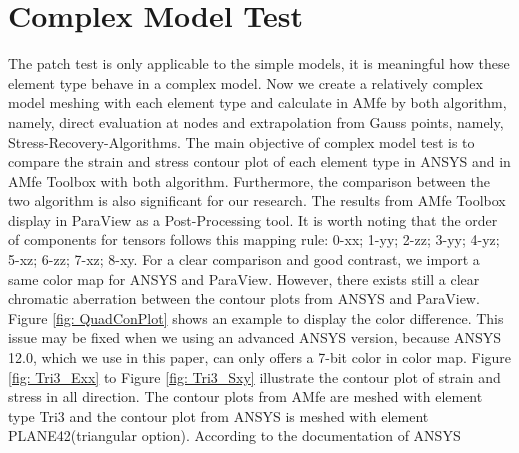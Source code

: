\section{Complex Model Test}
The patch test is only applicable to the simple models, it is meaningful how these element type behave in a complex model. Now we create a relatively complex model meshing with each element type and calculate in AMfe by both algorithm, namely, direct evaluation at nodes and extrapolation from Gauss points, namely, Stress-Recovery-Algorithms. The main objective of complex model test is to compare the strain and stress contour plot of each element type in ANSYS and in AMfe Toolbox with both algorithm. Furthermore, the comparison between the two algorithm is also significant for our research. The results from AMfe Toolbox display in ParaView as a Post-Processing tool. It is worth noting that the order of components for tensors follows this mapping rule: 0-xx; 1-yy; 2-zz;  3-yy; 4-yz; 5-xz; 6-zz; 7-xz; 8-xy. For a clear comparison and good contrast, we import a same color map for ANSYS and ParaView. However, there exists still a clear chromatic aberration between the contour plots from ANSYS and ParaView. Figure \ref{fig: QuadConPlot} shows an example to display the color difference. This issue may be fixed when we using an advanced ANSYS version, because ANSYS 12.0, which we use in this paper, can only offers a 7-bit color in color map. Figure \ref{fig: Tri3_Exx} to Figure \ref{fig: Tri3_Sxy} illustrate the contour plot of strain and stress in all direction. The contour plots from AMfe are meshed with element type Tri3 and the contour plot from ANSYS is meshed with element PLANE42(triangular option). According to the documentation of ANSYS 

